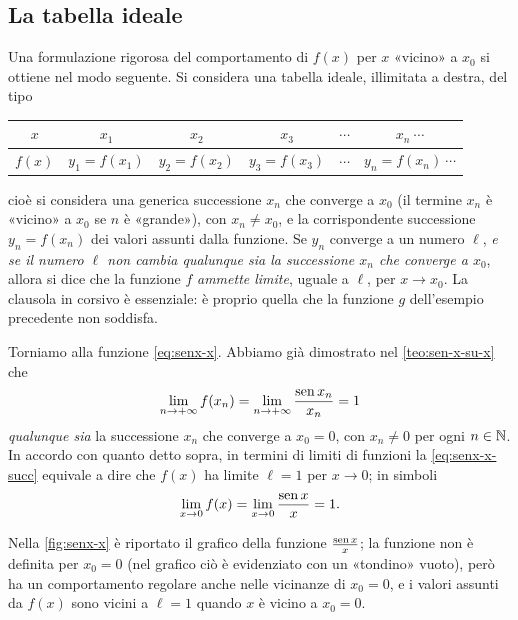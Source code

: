 \subsection{La tabella ideale}

Una formulazione rigorosa del comportamento di $f(x)$ per $x$ «vicino» a $x_{0}$ si
ottiene nel modo seguente. Si considera una tabella ideale, illimitata a destra, del tipo
\begin{center}
\renewcommand{\arraystretch}{1.4}
\begin{tabular}{c|ccccc}
  $x$ & $x_{1}$ & $x_{2}$ & $x_{3}$ & $\cdots$ & $x_{n}\ \cdots$\\ \hline
  $f(x)$ & $y_{1}=f(x_{1})$ & $y_{2}=f(x_{2})$ & $y_{3}=f(x_{3})$ & $\cdots$ & $y_{n}=f(x_{n})\ \cdots$
\end{tabular}
\end{center}
cioè si considera una generica successione $x_{n}$ che converge a $x_{0}$ (il termine
$x_{n}$ è «vicino» a $x_{0}$ se $n$ è «grande»), con $x_{n}\neq x_{0}$, e la
corrispondente successione $y_{n}=f(x_{n})$ dei valori assunti dalla funzione. Se $y_{n}$
converge a un numero $\ell$, \emph{e se il numero $\ell$ non cambia qualunque sia la
successione $x_{n}$ che converge a $x_{0}$}, allora si dice che la funzione $f$
\emph{ammette limite}, uguale a $\ell$, per $x\to x_{0}$. La clausola in corsivo è
essenziale: è proprio quella che la funzione $g$ dell'esempio precedente non soddisfa.

Torniamo alla funzione \eqref{eq:senx-x}. Abbiamo già dimostrato nel
\cref{teo:sen-x-su-x} che
\begin{equation}\label{eq:senx-x-succ}
  \lim_{n\to+\infty}f(x_{n})=\lim_{n\to+\infty}\frac{\operatorname{sen} x_{n}}{x_{n}}=1
\end{equation}
\emph{qualunque sia} la successione $x_{n}$ che converge a $x_{0}=0$, con $x_{n}\neq0$ per
ogni $n\in\mathbb{N}$. In accordo con quanto detto sopra, in termini di limiti di funzioni la
\eqref{eq:senx-x-succ} equivale a dire che $f(x)$ ha limite $\ell=1$ per $x\to0$; in
simboli
\begin{equation}\label{eq:lim-senx-x}
  \lim_{x\to0}f(x)=\lim_{x\to0}\frac{\operatorname{sen} x}{x}=1 .
\end{equation}

Nella \cref{fig:senx-x} è riportato il grafico della funzione $\frac{\operatorname{sen} x}{x}$; la
funzione non è definita per $x_{0}=0$ (nel grafico ciò è evidenziato con un «tondino»
vuoto), però ha un comportamento regolare anche nelle vicinanze di $x_{0}=0$, e i valori
assunti da $f(x)$ sono vicini a $\ell=1$ quando $x$ è vicino a $x_{0}=0$.

